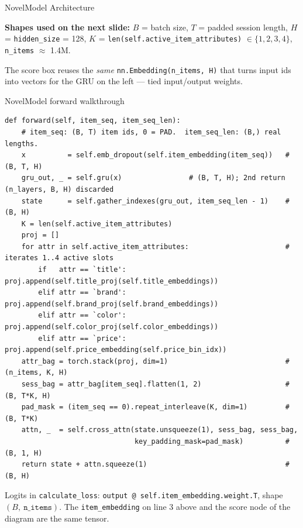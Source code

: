 \documentclass[10pt,aspectratio=169]{beamer}
\newcommand{\code}[1]{\texttt{#1}}
\begin{document}
\begin{frame}{NovelModel Architecture}
  \vspace{0.6em}
  {\footnotesize
  \textbf{Shapes used on the next slide:}
  \(B\) = batch size,\;
  \(T\) = padded session length,\;
  \(H\) = \code{hidden\_size} = 128,\;
  \(K\) = \code{len(self.active\_item\_attributes)} \(\in\{1,2,3,4\}\),\;
  \texttt{n\_items} \(\approx\) 1.4M.

  \vspace{0.3em}
  The score box reuses the \emph{same} \code{nn.Embedding(n\_items, H)} that turns input ids into vectors for the GRU on the left --- tied input/output weights.
  }
\end{frame}

\begin{frame}[fragile]{NovelModel forward walkthrough}
\vspace{-0.6em}
\scriptsize
\begin{verbatim}
def forward(self, item_seq, item_seq_len):
    # item_seq: (B, T) item ids, 0 = PAD.  item_seq_len: (B,) real lengths.
    x          = self.emb_dropout(self.item_embedding(item_seq))   # (B, T, H)
    gru_out, _ = self.gru(x)                # (B, T, H); 2nd return (n_layers, B, H) discarded
    state      = self.gather_indexes(gru_out, item_seq_len - 1)    # (B, H)
    K = len(self.active_item_attributes)
    proj = []
    for attr in self.active_item_attributes:                       # iterates 1..4 active slots
        if   attr == `title': proj.append(self.title_proj(self.title_embeddings))
        elif attr == `brand': proj.append(self.brand_proj(self.brand_embeddings))
        elif attr == `color': proj.append(self.color_proj(self.color_embeddings))
        elif attr == `price': proj.append(self.price_embedding(self.price_bin_idx))
    attr_bag = torch.stack(proj, dim=1)                            # (n_items, K, H)
    sess_bag = attr_bag[item_seq].flatten(1, 2)                    # (B, T*K, H)
    pad_mask = (item_seq == 0).repeat_interleave(K, dim=1)         # (B, T*K)
    attn, _  = self.cross_attn(state.unsqueeze(1), sess_bag, sess_bag,
                               key_padding_mask=pad_mask)          # (B, 1, H)
    return state + attn.squeeze(1)                                 # (B, H)
\end{verbatim}
\scriptsize Logits in \code{calculate\_loss}: \code{output @ self.item\_embedding.weight.T}, shape \((B,\ \texttt{n\_items})\). The \code{item\_embedding} on line 3 above and the score node of the diagram are the same tensor.
\end{frame}
\end{document}
